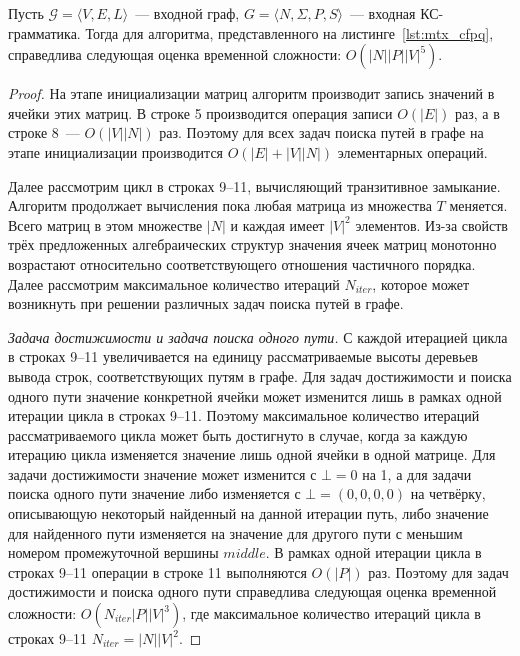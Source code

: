 \begin{theorem}\label{thm:time_mtx}
	Пусть $\mathcal{G} = \langle V, E, L \rangle$~--- входной граф, $G =\langle N, \Sigma, P, S \rangle$~--- входная КС-грамматика. Тогда для алгоритма, представленного на листинге~\ref{lst:mtx_cfpq}, справедлива следующая оценка временной сложности: $O(|N||P||V|^5)$.
\end{theorem}
\begin{proof}
На этапе инициализации матриц алгоритм производит запись значений в ячейки этих матриц. В строке 5 производится операция записи $O(|E|)$ раз, а в строке 8~--- $O(|V||N|)$ раз. Поэтому для всех задач поиска путей в графе на этапе инициализации производится $O(|E|+|V||N|)$ элементарных операций. 

Далее рассмотрим цикл в строках 9--11, вычисляющий транзитивное замыкание. Алгоритм продолжает вычисления пока любая матрица из множества $T$ меняется. Всего матриц в этом множестве $|N|$ и каждая имеет $|V|^2$ элементов. Из-за свойств трёх предложенных алгебраических структур значения ячеек матриц монотонно возрастают относительно соответствующего отношения частичного порядка. Далее рассмотрим максимальное количество итераций $N_{\textit{iter}}$, которое может возникнуть при решении различных задач поиска путей в графе.

\textit{Задача достижимости и задача поиска одного пути.} С каждой итерацией цикла в строках 9--11 увеличивается на единицу рассматриваемые высоты деревьев вывода строк, соответствующих путям в графе. Для задач достижимости и поиска одного пути значение конкретной ячейки может изменится лишь в рамках одной итерации цикла в строках 9--11. Поэтому максимальное количество итераций рассматриваемого цикла может быть достигнуто в случае, когда за каждую итерацию цикла изменяется значение лишь одной ячейки в одной матрице. Для задачи достижимости значение может изменится с $\bot = 0$ на 1, а для задачи поиска одного пути значение либо изменяется с $\bot = (0, 0, 0, 0)$ на четвёрку, описывающую некоторый найденный на данной итерации путь, либо значение для найденного пути изменяется на значение для другого пути с меньшим номером промежуточной вершины $\textit{middle}$. В рамках одной итерации цикла в строках 9--11 операции в строке 11 выполняются $O(|P|)$ раз. Поэтому для задач достижимости и поиска одного пути справедлива следующая оценка временной сложности: $O(N_{\textit{iter}} |P||V|^3)$, где максимальное количество итераций цикла в строках 9--11 $N_{\textit{iter}} = |N||V|^2$.


\end{proof}

